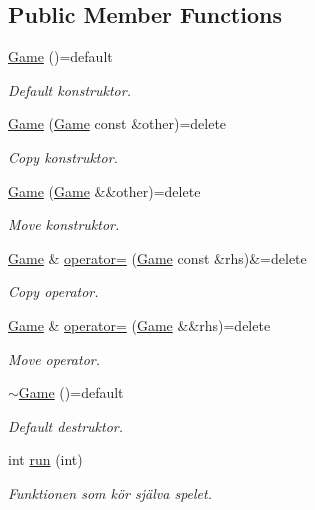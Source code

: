 \subsection*{Public Member Functions}
\begin{DoxyCompactItemize}
\item 
\hyperlink{classGame_a4735989677c1cab18866f3ae4ee0aa1c}{Game} ()=default
\begin{DoxyCompactList}\small\item\em Default konstruktor. \end{DoxyCompactList}\item 
\hyperlink{classGame_a09c8ffcbf57e2e60f86a4c6071c73df1}{Game} (\hyperlink{classGame}{Game} const \&other)=delete
\begin{DoxyCompactList}\small\item\em Copy konstruktor. \end{DoxyCompactList}\item 
\hyperlink{classGame_af6029629f9ebfc665b355daa0ba5702b}{Game} (\hyperlink{classGame}{Game} \&\&other)=delete
\begin{DoxyCompactList}\small\item\em Move konstruktor. \end{DoxyCompactList}\item 
\hyperlink{classGame}{Game} \& \hyperlink{classGame_a3679df3694806d8d8580d7ac8a351300}{operator=} (\hyperlink{classGame}{Game} const \&rhs)\&=delete
\begin{DoxyCompactList}\small\item\em Copy operator. \end{DoxyCompactList}\item 
\hyperlink{classGame}{Game} \& \hyperlink{classGame_a059b8ac540d33c882ae792f9590cc93c}{operator=} (\hyperlink{classGame}{Game} \&\&rhs)=delete
\begin{DoxyCompactList}\small\item\em Move operator. \end{DoxyCompactList}\item 
\hyperlink{classGame_a3d09cd0b68ef69107d36360ca903e023}{$\sim$\+Game} ()=default
\begin{DoxyCompactList}\small\item\em Default destruktor. \end{DoxyCompactList}\item 
int \hyperlink{classGame_aedc2d87ef2e375e019c4c6f3d47da429}{run} (int)
\begin{DoxyCompactList}\small\item\em Funktionen som kör själva spelet. \end{DoxyCompactList}\item 

\end{DoxyCompactItemize}
